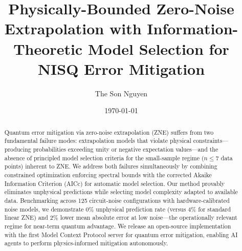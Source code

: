 \title{Physically-Bounded Zero-Noise Extrapolation with Information-Theoretic Model Selection for NISQ Error Mitigation}

\author{The Son Nguyen}

\date{\today}

\begin{abstract}
Quantum error mitigation via zero-noise extrapolation (ZNE) suffers from two fundamental failure modes: extrapolation models that violate physical constraints---producing probabilities exceeding unity or negative expectation values---and the absence of principled model selection criteria for the small-sample regime ($n \leq 7$ data points) inherent to ZNE.
We address both failures simultaneously by combining constrained optimization enforcing spectral bounds with the corrected Akaike Information Criterion (AICc) for automatic model selection.
Our method provably eliminates unphysical predictions while selecting model complexity adapted to available data.
Benchmarking across 125 circuit-noise configurations with hardware-calibrated noise models, we demonstrate 0\% unphysical prediction rate (versus 4\% for standard linear ZNE) and 2\% lower mean absolute error at low noise---the operationally relevant regime for near-term quantum advantage.
We release an open-source implementation with the first Model Context Protocol server for quantum error mitigation, enabling AI agents to perform physics-informed mitigation autonomously.
\end{abstract}
